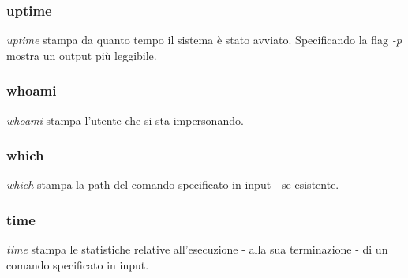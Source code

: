 \subsubsection{uptime}
\textit{uptime} stampa da quanto tempo il sistema è stato avviato. Specificando la flag \textit{-p} mostra un output più leggibile.

\subsubsection{whoami}
\textit{whoami} stampa l'utente che si sta impersonando.

\subsubsection{which}
\textit{which} stampa la path del comando specificato in input - se esistente.

\subsubsection{time}
\textit{time} stampa le statistiche relative all'esecuzione - alla sua terminazione - di un comando specificato in input.

